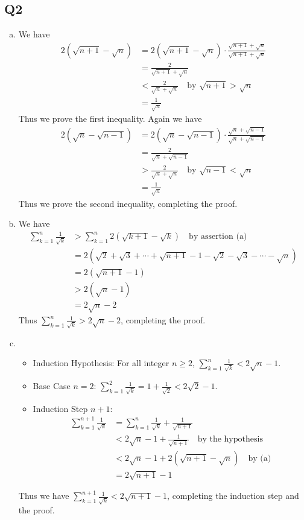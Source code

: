 \documentclass[12pt,lettersize]{article}
\begin{document}
\subsection*{Q2}
\begin{enumerate}[(a)]
	\item We have
	\begin{align*}
		2(\sqrt{n+1}-\sqrt{n}) &= 2(\sqrt{n+1}-\sqrt{n})\cdot\frac{\sqrt{n+1}+\sqrt{n}}{\sqrt{n+1}+\sqrt{n}}\\
							   &= \frac{2}{\sqrt{n+1}+\sqrt{n}}\\
							   &< \frac{2}{\sqrt{n}+\sqrt{n}}\quad\text{by $\sqrt{n+1}>\sqrt{n}$}\\
							   &= \frac{1}{\sqrt{n}}
	\end{align*}
	Thus we prove the first inequality. Again we have
	\begin{align*}
		2(\sqrt{n}-\sqrt{n-1}) &= 2(\sqrt{n}-\sqrt{n-1})\cdot\frac{\sqrt{n}+\sqrt{n-1}}{\sqrt{n}+\sqrt{n-1}}\\
							   &= \frac{2}{\sqrt{n}+\sqrt{n-1}}\\
							   &> \frac{2}{\sqrt{n}+\sqrt{n}}\quad\text{by $\sqrt{n-1}<\sqrt{n}$}\\
							   &= \frac{1}{\sqrt{n}}
	\end{align*}
	Thus we prove the second inequality, completing the proof.
	\item We have
	\begin{align*}
		\sum_{k=1}^{n}\frac{1}{\sqrt{k}} &> \sum_{k=1}^{n}2(\sqrt{k+1}-\sqrt{k})\quad\text{by assertion (a)}\\
										 &= 2(\sqrt{2}+\sqrt{3}+\cdots+\sqrt{n+1}-1-\sqrt{2}-\sqrt{3}-\cdots-\sqrt{n})\\
										 &= 2(\sqrt{n+1}-1)\\
										 &> 2(\sqrt{n}-1)\\
										 &= 2\sqrt{n}-2
	\end{align*}
	Thus $\sum_{k=1}^{n}\frac{1}{\sqrt{k}}>2\sqrt{n}-2$, completing the proof.
	\item 
	\begin{itemize}
		\item Induction Hypothesis: For all integer $n\geq2$, $\sum_{k=1}^{n}\frac{1}{\sqrt{k}}<2\sqrt{n}-1$.
		\item Base Case $n=2$: $\sum_{k=1}^{2}\frac{1}{\sqrt{k}}=1+\frac{1}{\sqrt{2}}<2\sqrt{2}-1$. 
		\item Induction Step $n+1$: \begin{align*}
			\sum_{k=1}^{n+1}\frac{1}{\sqrt{k}} &= \sum_{k=1}^{n}\frac{1}{\sqrt{k}}+\frac{1}{\sqrt{n+1}}\\
											   &<2\sqrt{n}-1+\frac{1}{\sqrt{n+1}}\quad\text{by the hypothesis}\\
											   &<2\sqrt{n}-1+2(\sqrt{n+1}-\sqrt{n})\quad\text{by (a)}\\
											   &=2\sqrt{n+1}-1	
		\end{align*}
	\end{itemize}
	Thus we have $\sum_{k=1}^{n+1}\frac{1}{\sqrt{k}}<2\sqrt{n+1}-1$, completing the induction step and the proof.
\end{enumerate}
\newpage
\end{document}
